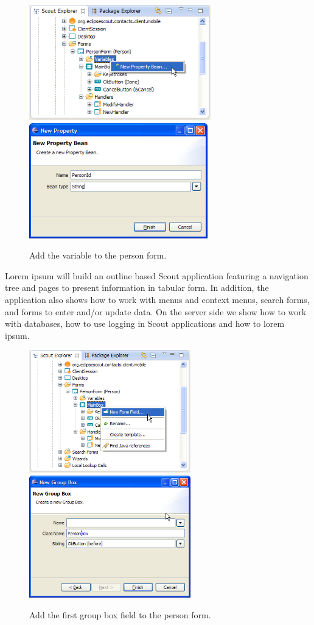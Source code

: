 \documentclass[a4paper,10pt,twoside]{book}
\begin{document}
\begin{figure}
\includegraphics[height=5cm]{new_bean_personid_contextmenu.png} \hspace{5mm}
\includegraphics[height=5cm]{new_bean_personid.png}
\caption{Add the  variable to the person form.}
\end{figure}

Lorem ipsum will build an outline based Scout application featuring a navigation tree and pages to present information in tabular form. 
In addition, the application also shows how to work with menus and context menus, search forms, and forms to enter and/or update data. 
On the server side we show how to work with databases, how to use logging in Scout applications and how to lorem ipsum. 

\begin{figure}
\includegraphics[width=7cm]{new_field_personbox.png} \hspace{5mm}
\includegraphics[width=7cm]{new_field_personbox_name.png}
\caption{Add the first group box field to the person form.}
\end{figure}
\end{document}
